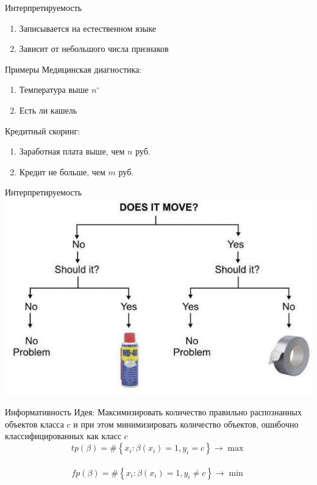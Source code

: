 \documentclass[10pt]{beamer}
\begin{document}
\begin{frame}{Интерпретируемость}
	\begin{enumerate}
		\item Записывается на естественном языке
		\item Зависит от небольшого числа признаков
	\end{enumerate}
\end{frame}

\begin{frame}{Примеры}
	Медицинская диагностика:	
		\begin{enumerate} [-]
			\item Температура выше $n^\circ$
			\item Есть ли кашель
		\end{enumerate}
	\bigbreak
	Кредитный скоринг:	
		\begin{enumerate} [-]
			\item Заработная плата выше, чем $n$ руб.
			\item Кредит не больше, чем $m$ руб.
		\end{enumerate}
\end{frame}

\begin{frame}{Интерпретируемость}
    \centering
	\includegraphics[width=\textwidth, height=0.8 \textheight, keepaspectratio]{images/decisiontree}
\end{frame}


\begin{frame}{Информативность}
  \alert{Идея}: Максимизировать количество правильно распознанных объектов класса $c$ и при этом минимизировать количество объектов, ошибочно классифицированных как класс $c$
  \pause
	\bigbreak
	$${ tp(\beta) = \# \left\{ x_i: \beta(x_i) = 1 , y_i = c \right\} \rightarrow \max }$$\\
	\pause
  \bigbreak
	$${ fp(\beta) = \# \left\{ x_i: \beta(x_i) = 1 , y_i \neq c \right\} \rightarrow \min }$$\\		
\end{frame}
\end{document}
